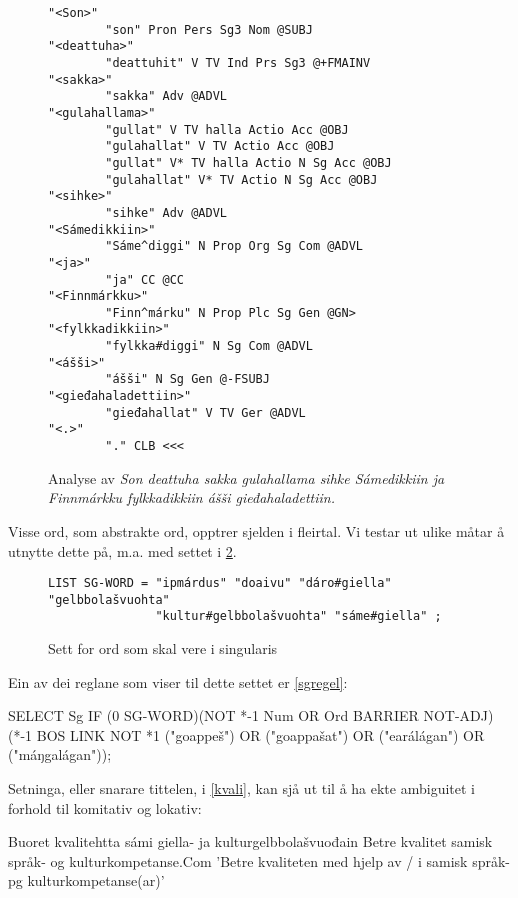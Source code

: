 \documentclass[a4paper,nynorsk]{article}
\begin{document}
\begin{figure}[htbp]
\begin{center}
\begin{verbatim}
"<Son>"
        "son" Pron Pers Sg3 Nom @SUBJ
"<deattuha>"
        "deattuhit" V TV Ind Prs Sg3 @+FMAINV
"<sakka>"
        "sakka" Adv @ADVL
"<gulahallama>"
        "gullat" V TV halla Actio Acc @OBJ
        "gulahallat" V TV Actio Acc @OBJ
        "gullat" V* TV halla Actio N Sg Acc @OBJ
        "gulahallat" V* TV Actio N Sg Acc @OBJ
"<sihke>"
        "sihke" Adv @ADVL
"<Sámedikkiin>"
        "Sáme^diggi" N Prop Org Sg Com @ADVL
"<ja>"
        "ja" CC @CC
"<Finnmárkku>"
        "Finn^márku" N Prop Plc Sg Gen @GN>
"<fylkkadikkiin>"
        "fylkka#diggi" N Sg Com @ADVL
"<ášši>"
        "ášši" N Sg Gen @-FSUBJ
"<gieđahaladettiin>"
        "gieđahallat" V TV Ger @ADVL
"<.>"
        "." CLB <<<
\end{verbatim}

\caption{Analyse av \emph{Son deattuha sakka gulahallama sihke Sámedikkiin ja Finnmárkku fylkkadikkiin ášši gieđahaladettiin.}}
\label{fylkeanalyse}
\end{center}
\end{figure}

Visse ord, som abstrakte ord, opptrer sjelden i fleirtal. Vi testar ut ulike måtar å utnytte dette på, m.a. med settet i \ref{sgwds}. %


\begin{figure}[htbp]
\begin{center}
\begin{verbatim}
LIST SG-WORD = "ipmárdus" "doaivu" "dáro#giella" "gelbbolašvuohta" 
               "kultur#gelbbolašvuohta" "sáme#giella" ;
\end{verbatim}
\caption{Sett for ord som skal vere i singularis}
\label{sgwds}
\end{center}
\end{figure}

Ein av dei reglane  som viser til dette settet er \ref{sgregel}: %

\begin{example}\label{sgregel}
SELECT Sg IF (0 SG-WORD)(NOT *-1 Num OR Ord BARRIER NOT-ADJ)(*-1 BOS LINK NOT *1 ("goappeš") OR ("goappašat") OR ("earálágan") OR ("máŋgalágan"));
\end{example}

Setninga, eller snarare tittelen, i \ref{kvali}, kan sjå ut til å ha ekte ambiguitet i forhold til komitativ og lokativ: %

\begin{example}\label{kvali}
\gll Buoret kvalitehtta sámi giella- ja kulturgelbbolašvuođain
      Betre kvalitet samisk språk- og kulturkompetanse.Com
\glt 'Betre kvaliteten med hjelp av / i samisk språk- pg kulturkompetanse(ar)'
\glend
\end{example}
\end{document}
